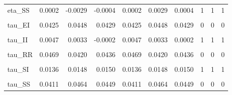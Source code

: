 \begin{table}[!h]
\begin{tabular}[t]{lrrrrrrrrr}
eta\_SS & 0.0002 & -0.0029 & -0.0004 & 0.0002 & 0.0029 & 0.0004 & 1 & 1 & 1\\
\addlinespace
\cellcolor{gray!10}{tau\_EE} & \cellcolor{gray!10}{0.0432} & \cellcolor{gray!10}{0.0450} & \cellcolor{gray!10}{0.0441} & \cellcolor{gray!10}{0.0432} & \cellcolor{gray!10}{0.0450} & \cellcolor{gray!10}{0.0441} & \cellcolor{gray!10}{0} & \cellcolor{gray!10}{0} & \cellcolor{gray!10}{0}\\
tau\_EI & 0.0425 & 0.0448 & 0.0429 & 0.0425 & 0.0448 & 0.0429 & 0 & 0 & 0\\
\cellcolor{gray!10}{tau\_ER} & \cellcolor{gray!10}{0.0482} & \cellcolor{gray!10}{0.0412} & \cellcolor{gray!10}{0.0483} & \cellcolor{gray!10}{0.0482} & \cellcolor{gray!10}{0.0412} & \cellcolor{gray!10}{0.0483} & \cellcolor{gray!10}{0} & \cellcolor{gray!10}{0} & \cellcolor{gray!10}{0}\\
tau\_II & 0.0047 & 0.0033 & -0.0002 & 0.0047 & 0.0033 & 0.0002 & 1 & 1 & 1\\
\cellcolor{gray!10}{tau\_IR} & \cellcolor{gray!10}{0.0440} & \cellcolor{gray!10}{0.0497} & \cellcolor{gray!10}{0.0507} & \cellcolor{gray!10}{0.0440} & \cellcolor{gray!10}{0.0497} & \cellcolor{gray!10}{0.0507} & \cellcolor{gray!10}{0} & \cellcolor{gray!10}{0} & \cellcolor{gray!10}{0}\\
\addlinespace
tau\_RR & 0.0469 & 0.0420 & 0.0436 & 0.0469 & 0.0420 & 0.0436 & 0 & 0 & 0\\
\cellcolor{gray!10}{tau\_SE} & \cellcolor{gray!10}{0.0460} & \cellcolor{gray!10}{0.0493} & \cellcolor{gray!10}{0.0422} & \cellcolor{gray!10}{0.0460} & \cellcolor{gray!10}{0.0493} & \cellcolor{gray!10}{0.0422} & \cellcolor{gray!10}{0} & \cellcolor{gray!10}{0} & \cellcolor{gray!10}{0}\\
tau\_SI & 0.0136 & 0.0148 & 0.0150 & 0.0136 & 0.0148 & 0.0150 & 1 & 1 & 1\\
\cellcolor{gray!10}{tau\_SR} & \cellcolor{gray!10}{0.0481} & \cellcolor{gray!10}{0.0457} & \cellcolor{gray!10}{0.0423} & \cellcolor{gray!10}{0.0481} & \cellcolor{gray!10}{0.0457} & \cellcolor{gray!10}{0.0423} & \cellcolor{gray!10}{0} & \cellcolor{gray!10}{0} & \cellcolor{gray!10}{0}\\
tau\_SS & 0.0411 & 0.0464 & 0.0449 & 0.0411 & 0.0464 & 0.0449 & 0 & 0 & 0\\
\bottomrule
\end{tabular}
\end{table}
